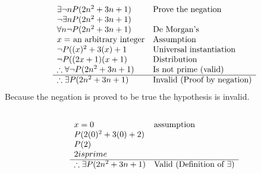 \documentclass[letterpaper]{article}
\begin{document}
	\section{}
    	\subsection{}
        	\begin{displaymath}
        		\begin{array}{ll}
        			\exists \neg n P(2n^2 + 3n + 1) & $Prove the negation$\\
                    \neg \exists n P(2n^2 + 3n + 1) & \\
                  	\forall n \neg P(2n^2 + 3n + 1) & $De Morgan's$\\
                    x = $ an arbitrary integer$ & $Assumption$\\
                    \neg P((x)^2 + 3(x) + 1 & $Universal instantiation$\\
                    \neg P((2x + 1)(x + 1) & $Distribution$\\
					\therefore \forall \neg P(2n^2 + 3n + 1) & $Is not prime (valid)$\\
                    \hline
                    \therefore \exists P(2n^2 + 3n + 1) & $Invalid (Proof by negation)$\\
        		\end{array}
        	\end{displaymath}
            Because the negation is proved to be true the hypothesis is invalid.
		\subsection{}
        	\begin{displaymath}
            	\begin{array}{ll}
            		x = 0 & $assumption$\\
                    P(2(0)^2 + 3(0) + 2) &\\
                    P(2) &\\
                    2 is prime & \\
                    \hline
                    \therefore \exists P(2n^2 + 3n + 1) & $Valid (Definition of $\exists$)$\\
            	\end{array}
        	\end{displaymath}
\end{document}
